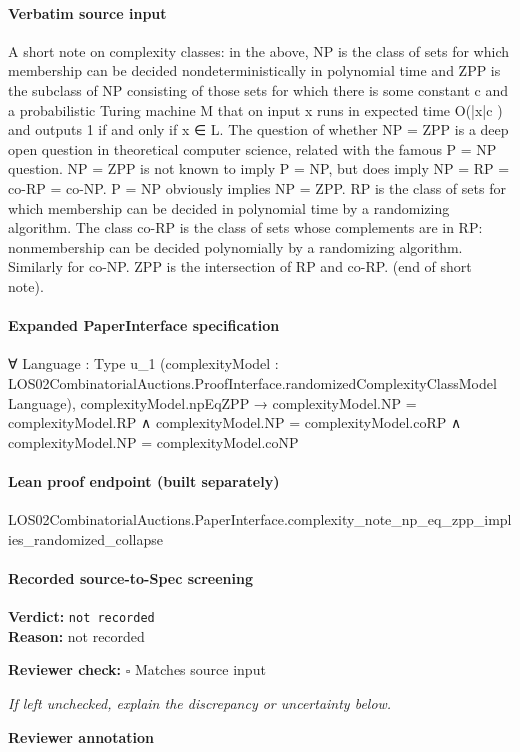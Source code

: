 \documentclass[10pt]{article}
\newcommand{\reviewerbox}{%
  \par\noindent\fbox{\parbox{0.96\linewidth}{\rule{0pt}{0.38in}}}\par
}
\newcommand{\reviewmatch}[1]{%
  \par\noindent\textbf{Reviewer check:} $\square$\; #1\par
  \noindent\emph{If left unchecked, explain the discrepancy or uncertainty below.}\par
}
\begin{document}
\paragraph{Verbatim source input}
\begin{ReviewVerbatim}
A short note on complexity classes: in the above, NP is the class of sets for which
membership can be decided nondeterministically in polynomial time and ZPP is
the subclass of NP consisting of those sets for which there is some constant c and a
probabilistic Turing machine M that on input x runs in expected time O(|x|c ) and
outputs 1 if and only if x ∈ L. The question of whether NP = ZPP is a deep open
question in theoretical computer science, related with the famous P = NP question.
NP = ZPP is not known to imply P = NP, but does imply NP = RP = co-RP =
co-NP. P = NP obviously implies NP = ZPP. RP is the class of sets for which
membership can be decided in polynomial time by a randomizing algorithm. The
class co-RP is the class of sets whose complements are in RP: nonmembership can
be decided polynomially by a randomizing algorithm. Similarly for co-NP. ZPP is
the intersection of RP and co-RP. (end of short note).
\end{ReviewVerbatim}


\paragraph{Expanded PaperInterface specification}
\begin{ReviewVerbatim}
∀ {Language : Type u_1}
  (complexityModel : LOS02CombinatorialAuctions.ProofInterface.randomizedComplexityClassModel Language),
  complexityModel.npEqZPP →
    complexityModel.NP = complexityModel.RP ∧
      complexityModel.NP = complexityModel.coRP ∧ complexityModel.NP = complexityModel.coNP
\end{ReviewVerbatim}

\paragraph{Lean proof endpoint (built separately)}\begin{ReviewVerbatim}
LOS02CombinatorialAuctions.PaperInterface.complexity_note_np_eq_zpp_implies_randomized_collapse
\end{ReviewVerbatim}

\paragraph{Recorded source-to-Spec screening}
\textbf{Verdict:} \texttt{not recorded}
\\
\textbf{Reason:} not recorded
\reviewmatch{Matches source input}
\noindent\textbf{Reviewer annotation}\par
\reviewerbox
\clearpage
\hypertarget{source-claim-b46d7e115e9a3120}{}
\end{document}
